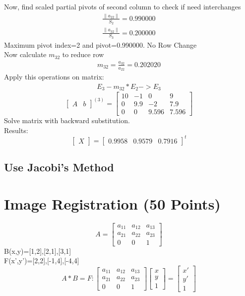 \documentclass{article}
\begin{document}
Now, find scaled partial pivots of second column to check if need interchanges
\begin{align}
	\frac{\|a_{22}\|}{S_{2}}=0.990000\\
	\frac{\|a_{32}\|}{S_{3}}=0.200000
\end{align}
Maximum pivot index=2 and pivot=0.990000. No Row Change\\
Now calculate $m_{32}$ to reduce row 
\begin{align}
	m_{32}=\frac{a_{32}}{a_{22}}=0.202020
\end{align}
Apply this operations on matrix:
\begin{align}
	E_{3}-m_{32}*E_{2}->E_{3}
\end{align}
\[
\left[
\begin{array}{c|c}
A&b
\end{array}
\right]^{(3)}
=
\left[
\begin{array}{ccc|c}
	10&-1&0&9\\
	0&9.9&-2&7.9\\
	0&0&9.596&7.596 
\end{array}
\right]
\]
Solve matrix with backward substitution.\\
Results:
\[
\begin{bmatrix}
X
\end{bmatrix}
=
\begin{bmatrix}
	0.9958&0.9579&0.7916
\end{bmatrix}^t
\]

\subsection{Use Jacobi's Method}
\section{Image Registration (50 Points)}
\[
A=
\begin{bmatrix}
	a_{11}&a_{12}&a_{13}\\
	a_{21}&a_{22}&a_{23}\\
	0&0&1
\end{bmatrix}
\]
B(x,y)={[1,2],[2,1],[3,1]}\\
F(x',y')={[2,2],[-1,4],[-4,4]}\\

\[
A*B=F : 
\begin{bmatrix}
	a_{11}&a_{12}&a_{13}\\
	a_{21}&a_{22}&a_{23}\\
	0&0&1
\end{bmatrix}
\begin{bmatrix}
	x\\y\\1
\end{bmatrix}
=
\begin{bmatrix}
	x'\\y'\\1
\end{bmatrix}
\]
\end{document}

